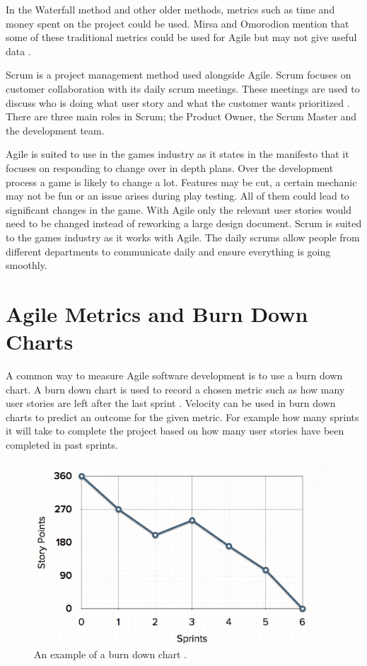 \documentclass{scrartcl}
\begin{document}
In the Waterfall method and other older methods, metrics such as time and money spent on the project could be used. Mirsa and Omorodion mention that some of these traditional metrics could be used for Agile but may not give useful data \cite{Misra}.

Scrum is a project management method used alongside Agile. Scrum focuses on customer collaboration with its daily scrum meetings. These meetings are used to discuss who is doing what user story and what the customer wants prioritized \cite{Sutherland}.
There are three main roles in Scrum; the Product Owner, the Scrum Master and the development team. \cite{Ktata}

Agile is suited to use in the games industry as it states in the manifesto that it focuses on responding to change over in depth plans. Over the development process a game is likely to change a lot. Features may be cut, a certain mechanic may not be fun or an issue arises during play testing. All of them could lead to significant changes in the game. With Agile only the relevant user stories would need to be changed instead of reworking a large design document. Scrum is suited to the games industry as it works with Agile. The daily scrums allow people from different departments to communicate daily and ensure everything is going smoothly.
\clearpage 
\section{Agile Metrics and Burn Down Charts}

A common way to measure Agile software development is to use a burn down chart. A burn down chart is used to record a chosen metric such as how many user stories are left after the last sprint \cite{AgileWithScrum}. Velocity can be used in burn down charts to predict an outcome for the given metric. For example how many sprints it will take to complete the project based on how many user stories have been completed in past sprints. %

\begin{figure}[h]
	\includegraphics[width=1.0\linewidth]{BDChart.jpg}
	\caption{ An example of a burn down chart \cite{MGS}.}
\end{figure}
\end{document}
